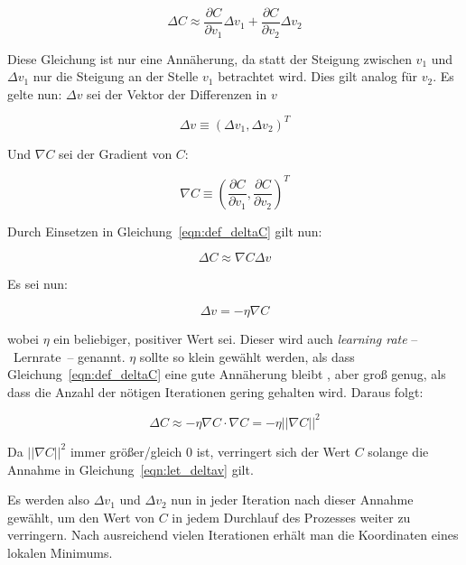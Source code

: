 \begin{equation}
\label{eqn:def_deltaC}
\Delta C\approx \frac{\partial C}{\partial v_1}\Delta v_1 + \frac{\partial C}{\partial v_2}\Delta v_2
\end{equation}

Diese Gleichung ist nur eine Annäherung, da statt der Steigung zwischen $v_1$ und $\Delta v_1$ nur die Steigung an der Stelle $v_1$ betrachtet wird. Dies gilt analog für $v_2$.
Es gelte nun: $\Delta v$ sei der Vektor der Differenzen in $v$

\begin{equation}
\Delta v\equiv (\Delta v_1, \Delta v_2)^T
\end{equation}

Und $\nabla C$ sei der Gradient von $C$:

\begin{equation}
\nabla C\equiv \left(\frac{\partial C}{\partial v_1}, \frac{\partial C}{\partial v_2}\right)^T
\end{equation}

Durch Einsetzen in Gleichung~\ref{eqn:def_deltaC} gilt nun:

\begin{equation}
\Delta C \approx \nabla C\Delta v
\end{equation}

Es sei nun:

\begin{equation}
\label{eqn:let_deltav}
\Delta v = -\eta\nabla C
\end{equation}

wobei $\eta$ ein beliebiger, positiver Wert sei. Dieser wird auch \textit{learning rate} --~Lernrate~-- genannt. $\eta$ sollte so klein gewählt werden, als dass Gleichung~\ref{eqn:def_deltaC} eine gute Annäherung bleibt \cite[Kap.~1]{nielsen_15}, aber groß genug, als dass die Anzahl der nötigen Iterationen gering gehalten wird. Daraus folgt:

\begin{equation}
\Delta C\approx -\eta\nabla C\cdot\nabla C= -\eta\left|\left|\nabla C\right| \right|^2
\end{equation}

Da $\left|\left|\nabla C\right| \right|^2$ immer größer/gleich 0 ist, verringert sich der Wert $C$ solange die Annahme in Gleichung~\ref{eqn:let_deltav} gilt. 

Es werden also $\Delta v_1$ und $\Delta v_2$ nun in jeder Iteration nach dieser Annahme gewählt, um den Wert von $C$ in jedem Durchlauf des Prozesses weiter zu verringern. Nach ausreichend vielen Iterationen erhält man die Koordinaten eines lokalen Minimums.

